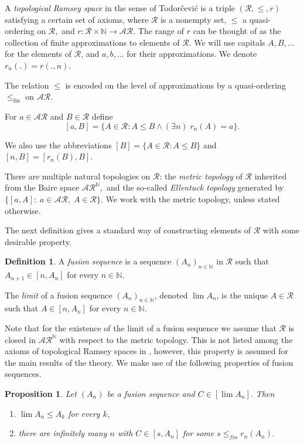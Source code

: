 \documentclass[10pt,a4paper]{amsart}
\newcommand{\N}{\mathbb{N}}
\newtheorem{proposition}[theorem]{Proposition}
\theoremstyle{definition}
\newtheorem{definition}[theorem]{Definition}
\newcommand{\fA}{\mathcal{A}}
\newcommand{\fR}{\mathcal{R}}
\begin{document}
	A \emph{topological Ramsey space} in the sense of Todor\v{c}evi\'c \cite{ramseyspaces} is a triple $(\mathcal{R},\le,r)$ satisfying a certain set of axioms, where $\mathcal{R}$ is a nonempty set, $\le$ a quasi-ordering on $\mathcal{R},$ and $r:\mathcal{R}\times\N\to\mathcal{AR}$. The range of $r$ can be thought of as the collection of finite approximations to elements of $\mathcal{R}$. We will use capitals $A,B,\ldots$ for the elements of $\mathcal{R}$, and $a,b,\ldots$ for their approximations. We denote $r_n(.)=r(.,n)$.
	
	The relation $\le$ is encoded on the level of approximations by a quasi-ordering $\le_{\text{fin}}$ on $\mathcal{AR}$.
	
	For $a\in\mathcal{AR}$ and $B\in\mathcal{R}$ define 
	$$[a,B]=\{A\in\mathcal{R}:A\le B \wedge (\exists n)\; r_n(A)=a\}.$$
	
	We also use the abbreviations $[B]=\{A\in\mathcal{R}:A\le B \}$ and $[n,B]=[r_n(B),B].$
	
	There are multiple natural topologies on $\fR$: the \emph{metric topology} of $\fR$ inherited from the Baire space $\fA\fR^\N,$ and the so-called \emph{Ellentuck topology} generated by $\{[a,A]:\; a\in\fA\fR,\; A\in\fR\}.$ We work with the metric topology, unless stated otherwise.
	
	
	
	The next definition gives a standard way of constructing elements of $\fR$ with some desirable property.
	
	\begin{definition}
		A \emph{fusion sequence} is a sequence $(A_n)_{n\in \N}$ in $\fR$ such that $A_{n+1}\in [n,A_n]$ for every $n\in\N.$
		
		The \emph{limit} of a fusion sequence $(A_n)_{n\in\N}$, denoted $\lim A_n$, is the unique $A\in\fR$ such that $A\in[n,A_n]$ for every $n\in\N.$ 
	\end{definition}
	
	Note that for the existence of the limit of a fusion sequence we assume that $\fR$ is closed in $\fA\fR^\N$ with respect to the metric topology. This is not listed among the axioms of topological Ramsey spaces in \cite{ramseyspaces}, however, this property is assumed for the main results of the theory. We make use of the following properties of fusion sequences.


	
	\begin{proposition}\label{fusion}
		Let $(A_n)$ be a fusion sequence and $C\in[\lim A_n].$ Then 
        \begin{enumerate}
            \item $\lim A_n\le A_k$ for every $k$,
            \item there are infinitely many $n$ with $C\in[s,A_n]$ for some $s\le_{fin}r_n(A_n).$
        \end{enumerate}
	\end{proposition}
	
\end{document}
